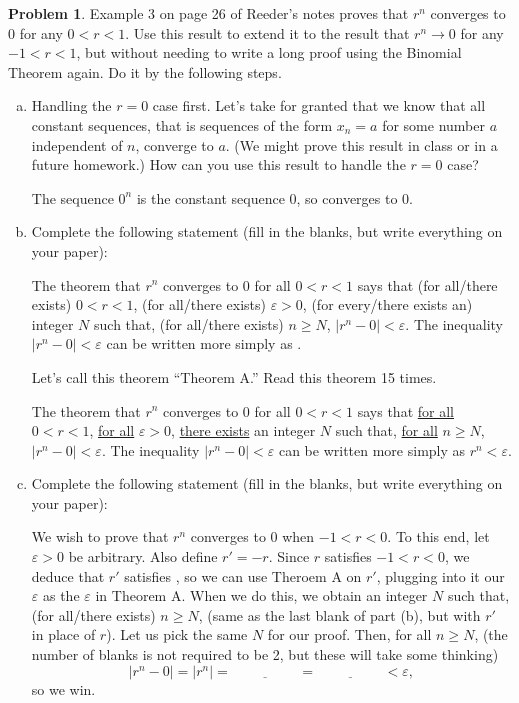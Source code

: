 \documentclass[11pt,oneside]{amsart}
\theoremstyle{definition}
\newtheorem{problem}{Problem}
\theoremstyle{plain}
\newcommand{\eps}{\varepsilon}
\newcommand{\blank}{\underline{\hspace{1cm}}}
\newcommand{\longblank}{\underline{\hspace{2cm}}}
\begin{document}
    \begin{problem}
        Example 3 on page 26 of Reeder's notes proves that $r^n$ converges to 0 for any $0<r<1$. Use this result to extend it to the result that $r^n\to 0$ for any $-1<r<1$, but without needing to write a long proof using the Binomial Theorem again. Do it by the following steps.
        \begin{enumerate}[(a)]
            \item Handling the $r=0$ case first. Let's take for granted that we know that all constant sequences, that is sequences of the form $x_n=a$ for some number $a$ independent of $n$, converge to $a$. (We might prove this result in class or in a future homework.) How can you use this result to handle the $r=0$ case?
            \begin{solution}
                The sequence $0^n$ is the constant sequence 0, so converges to 0.
            \end{solution}

            \item Complete the following statement (fill in the blanks, but write everything on your paper):
            
            The theorem that $r^n$ converges to 0 for all $0<r<1$ says that \blank (for all/there exists) $0<r<1$, \blank (for all/there exists) $\eps>0$, \blank (for every/there exists an) integer $N$ such that, \blank (for all/there exists) $n\geq N$, $|r^n-0|<\eps$. The inequality $|r^n-0|<\eps$ can be written more simply as \longblank.
            
            Let's call this theorem ``Theorem A.'' Read this theorem 15 times.

            \begin{solution}
                The theorem that $r^n$ converges to 0 for all $0<r<1$ says that \underline{for all} $0<r<1$, \underline{for all} $\eps>0$, \underline{there exists} an integer $N$ such that, \underline{for all} $n\geq N$, $|r^n-0|<\eps$. The inequality $|r^n-0|<\eps$ can be written more simply as \underline{$r^n<\eps$}.
            \end{solution}

            \item Complete the following statement (fill in the blanks, but write everything on your paper):
            
            We wish to prove that $r^n$ converges to 0 when $-1<r<0$. To this end, let $\eps>0$ be arbitrary. Also define $r'=-r$. Since $r$ satisfies $-1<r<0$, we deduce that $r'$ satisfies \blank, so we can use Theroem A on $r'$, plugging into it our $\eps$ as the $\eps$ in Theorem A. When we do this, we obtain an integer $N$ such that, \blank (for all/there exists) $n\geq N$, \longblank (same as the last blank of part (b), but with $r'$ in place of $r$). Let us pick the same $N$ for our proof. Then, for all $n\geq N$, (the number of blanks is not required to be 2, but these will take some thinking)
            \[|r^n-0|=|r^n|=\longblank=\longblank<\eps,\]
            so we win.


\end{enumerate}
\end{problem}
\end{document}
